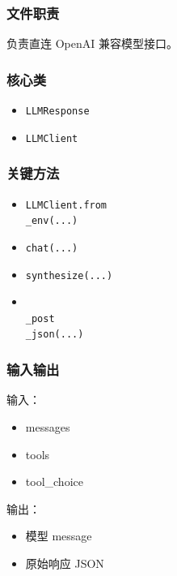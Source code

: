 \documentclass[UTF8,12pt,openany]{ctexbook}
\begin{document}
\subsubsection{文件职责}

负责直连 OpenAI 兼容模型接口。\par

\subsubsection{核心类}

\begin{itemize}
\item \texttt{LLMResponse}
\item \texttt{LLMClient}
\end{itemize}

\subsubsection{关键方法}

\begin{itemize}
\item \texttt{LLMClient.from\\_env(...)}
\item \texttt{chat(...)}
\item \texttt{synthesize(...)}
\item \texttt{\\_post\\_json(...)}
\end{itemize}

\subsubsection{输入输出}

输入：\par

\begin{itemize}
\item messages
\item tools
\item tool\_choice
\end{itemize}

输出：\par

\begin{itemize}
\item 模型 message
\item 原始响应 JSON
\end{itemize}
\end{document}
